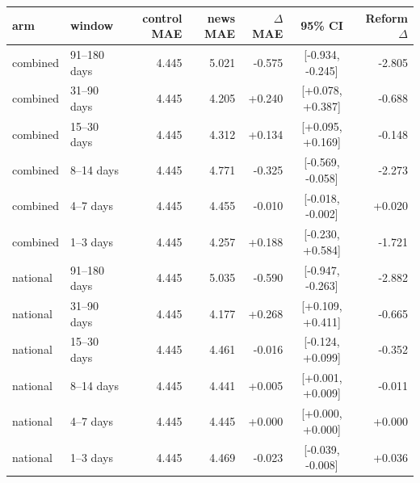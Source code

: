 \begin{tabular}{llrrrcr}
\toprule
arm & window & control MAE & news MAE & $\Delta$MAE & 95\% CI & Reform $\Delta$ \\
\midrule
combined & 91--180 days & 4.445 & 5.021 & -0.575 & [-0.934, -0.245] & -2.805 \\
combined & 31--90 days & 4.445 & 4.205 & +0.240 & [+0.078, +0.387] & -0.688 \\
combined & 15--30 days & 4.445 & 4.312 & +0.134 & [+0.095, +0.169] & -0.148 \\
combined & 8--14 days & 4.445 & 4.771 & -0.325 & [-0.569, -0.058] & -2.273 \\
combined & 4--7 days & 4.445 & 4.455 & -0.010 & [-0.018, -0.002] & +0.020 \\
combined & 1--3 days & 4.445 & 4.257 & +0.188 & [-0.230, +0.584] & -1.721 \\
national & 91--180 days & 4.445 & 5.035 & -0.590 & [-0.947, -0.263] & -2.882 \\
national & 31--90 days & 4.445 & 4.177 & +0.268 & [+0.109, +0.411] & -0.665 \\
national & 15--30 days & 4.445 & 4.461 & -0.016 & [-0.124, +0.099] & -0.352 \\
national & 8--14 days & 4.445 & 4.441 & +0.005 & [+0.001, +0.009] & -0.011 \\
national & 4--7 days & 4.445 & 4.445 & +0.000 & [+0.000, +0.000] & +0.000 \\
national & 1--3 days & 4.445 & 4.469 & -0.023 & [-0.039, -0.008] & +0.036 \\
\bottomrule
\end{tabular}

